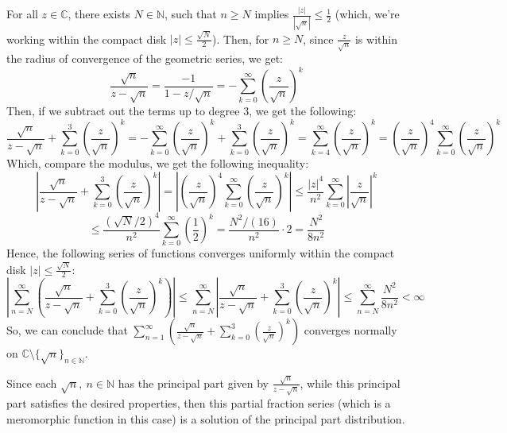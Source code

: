 \documentclass{article}
\begin{document}
For all $z\in\mathbb{C}$, there exists $N\in\mathbb{N}$, such that $n\geq N$ implies $\frac{|z|}{|\sqrt{n}|}\leq\frac{1}{2}$ (which, we're working within the compact disk $|z|\leq \frac{\sqrt{N}}{2}$). Then, for $n\geq N$, since $\frac{z}{\sqrt{n}}$ is within the radius of convergence of the geometric series, we get:
$$\frac{\sqrt{n}}{z-\sqrt{n}}=\frac{-1}{1-z/\sqrt{n}}=-\sum_{k=0}^{\infty}\left(\frac{z}{\sqrt{n}}\right)^k$$
Then, if we subtract out the terms up to degree 3, we get the following:
$$\frac{\sqrt{n}}{z-\sqrt{n}}+\sum_{k=0}^{3}\left(\frac{z}{\sqrt{n}}\right)^k=-\sum_{k=0}^{\infty}\left(\frac{z}{\sqrt{n}}\right)^k+\sum_{k=0}^{3}\left(\frac{z}{\sqrt{n}}\right)^k=\sum_{k=4}^{\infty}\left(\frac{z}{\sqrt{n}}\right)^k = \left(\frac{z}{\sqrt{n}}\right)^4\sum_{k=0}^{\infty}\left(\frac{z}{\sqrt{n}}\right)^k$$
Which, compare the modulus, we get the following inequality:
$$\left|\frac{\sqrt{n}}{z-\sqrt{n}}+\sum_{k=0}^{3}\left(\frac{z}{\sqrt{n}}\right)^k\right|= \left|\left(\frac{z}{\sqrt{n}}\right)^4\sum_{k=0}^{\infty}\left(\frac{z}{\sqrt{n}}\right)^k\right|\leq\frac{|z|^4}{n^2}\sum_{k=0}^{\infty}\left|\frac{z}{\sqrt{n}}\right|^k$$
$$\leq \frac{(\sqrt{N}/2)^4}{n^2}\sum_{k=0}^{\infty}\left(\frac{1}{2}\right)^k = \frac{N^2/(16)}{n^2}\cdot 2 = \frac{N^2}{8n^2}$$
Hence, the following series of functions converges uniformly within the compact disk $|z|\leq \frac{\sqrt{N}}{2}$:
$$\left|\sum_{n=N}^{\infty}\left(\frac{\sqrt{n}}{z-\sqrt{n}}+\sum_{k=0}^{3}\left(\frac{z}{\sqrt{n}}\right)^k\right)\right|\leq \sum_{n=N}^{\infty}\left|\frac{\sqrt{n}}{z-\sqrt{n}}+\sum_{k=0}^{3}\left(\frac{z}{\sqrt{n}}\right)^k\right| \leq \sum_{n=N}^{\infty}\frac{N^2}{8n^2}<\infty$$
So, we can conclude that $\sum_{n=1}^{\infty}\left(\frac{\sqrt{n}}{z-\sqrt{n}}+\sum_{k=0}^{3}\left(\frac{z}{\sqrt{n}}\right)^k\right)$ converges normally on $\mathbb{C}\setminus\{\sqrt{n}\}_{n\in\mathbb{N}}$. 

\hfil

Since each $\sqrt{n},\ n\in\mathbb{N}$ has the principal part given by $\frac{\sqrt{n}}{z-\sqrt{n}}$, while this principal part satisfies the desired properties, then this partial fraction series (which is a meromorphic function in this case) is a solution of the principal part distribution.
\end{document}

